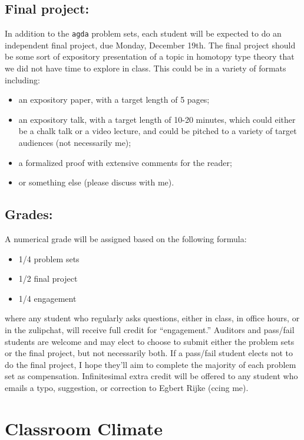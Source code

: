 \documentclass{amsart}
\theoremstyle{definition}
\theoremstyle{remark}
\numberwithin{equation}{section}
\begin{document}
\subsection*{Final project:}
In addition to the \texttt{agda} problem sets, each student will be expected to do an independent final project, due Monday, December 19th. The final project should be some sort of expository presentation of a topic in homotopy type theory that we did not have time to explore in class. This could be in a variety of formats including:
\begin{itemize}
\item an expository paper, with a target length of 5 pages;
\item an expository talk, with a target length of 10-20 minutes, which could either be a chalk talk or a video lecture, and could be pitched to a variety of target audiences (not necessarily me);
\item a formalized proof with extensive comments for the reader;
\item or something else (please discuss with me).
\end{itemize}

\subsection*{Grades:}
A numerical grade will be assigned based on the following formula:
\begin{itemize}
\item 1/4 problem sets
\item 1/2 final project
\item 1/4 engagement
\end{itemize}
where any student who regularly asks questions, either in class, in office hours, or in the zulipchat, will receive full credit for ``engagement.'' Auditors and pass/fail students are welcome and may elect to choose to submit either the problem sets or the final project, but not necessarily both. If a pass/fail student elects not to do the final project, I hope they'll aim to complete the majority of each problem set as compensation. Infinitesimal extra credit will be offered to any student who emails a typo, suggestion, or correction to Egbert Rijke (ccing me).


\section*{Classroom Climate}
\end{document}
